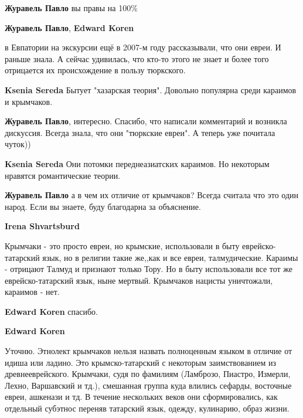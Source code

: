 \begin{itemize}
\begin{itemize}
\begin{itemize}
\textbf{Журавель Павло} вы правы на 100\%

\end{itemize} %

\textbf{Журавель Павло}, \textbf{Edward Koren} 

в Евпатории на экскурсии ещё в 2007-м году рассказывали, что они евреи. И
раньше знала. А сейчас удивилась, что кто-то этого не знает и более того
отрицается их происхождение в пользу тюркского.

\begin{itemize} %
\textbf{Ksenia Sereda} Бытует "хазарская теория". Довольно популярна среди караимов и крымчаков.

\textbf{Журавель Павло}, интересно. Спасибо, что написали комментарий и возникла дискуссия. Всегда знала, что они "тюркские евреи". А теперь уже почитала чуток))

\textbf{Ksenia Sereda} Они потомки переднеазиатских караимов. Но некоторым нравятся романтические теории.

\textbf{Журавель Павло} а в чем их отличие от крымчаков? Всегда считала что это один народ. Если вы знаете, буду благодарна за объяснение.

\textbf{Irena Shvartsburd} 

Крымчаки - это просто евреи, но крымские, использовали в быту
еврейско-татарский язык, но в религии такие же,,как и все евреи, талмудические.
Караимы - отрицают Талмуд и признают только Тору. Но в быту использовали все
тот же еврейско-татарский язык, ныне мертвый. Крымчаков нацисты уничтожали,
караимов - нет.

\textbf{Edward Koren} спасибо.

\textbf{Edward Koren} 

Уточню. Этнолект крымчаков нельзя назвать полноценным языком в отличие от идиша
или ладино. Это крымско-татарский с некоторым заимствованием из
древнееврейского. Крымчаки, судя по фамилиям (Ламброзо, Пиастро, Измерли,
Лехно, Варшавский и тд.), смешанная группа куда влились сефарды, восточные
евреи, ашкенази и тд. В течение нескольких веков они сформировались, как
отдельный субэтнос переняв татарский язык, одежду, кулинарию, образ жизни.

\end{itemize} %

\end{itemize} %


\end{itemize}
